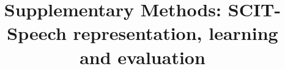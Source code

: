\documentclass[final,5p,times,twocolumn]{elsarticle}
\begin{document}
\begin{frontmatter}
\title{Supplementary Methods: SCIT-Speech representation, learning and evaluation}
\end{frontmatter}


{\small

}
\end{document}

